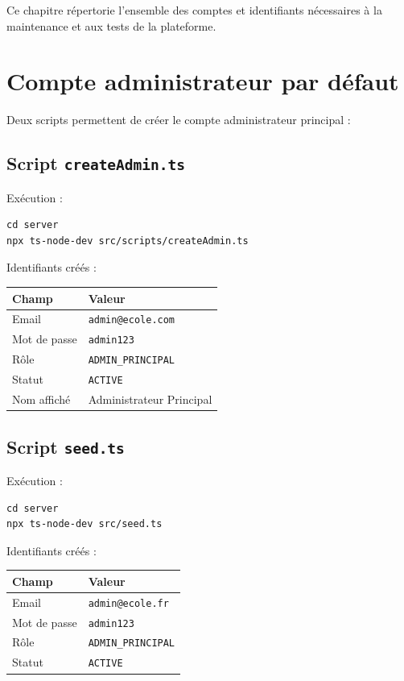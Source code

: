 \documentclass[12pt,a4paper]{report}
\begin{document}
Ce chapitre répertorie l'ensemble des comptes et identifiants nécessaires à la maintenance et aux tests de la plateforme.

\section{Compte administrateur par défaut}

Deux scripts permettent de créer le compte administrateur principal :

\subsection{Script \texttt{createAdmin.ts}}

Exécution :
\begin{lstlisting}
cd server
npx ts-node-dev src/scripts/createAdmin.ts
\end{lstlisting}

Identifiants créés :
\begin{longtable}{|p{4cm}|p{10.5cm}|}
\hline
\textbf{Champ} & \textbf{Valeur} \\
\hline
Email & \texttt{admin@ecole.com} \\
\hline
Mot de passe & \texttt{admin123} \\
\hline
Rôle & \texttt{ADMIN\_PRINCIPAL} \\
\hline
Statut & \texttt{ACTIVE} \\
\hline
Nom affiché & Administrateur Principal \\
\hline
\end{longtable}

\subsection{Script \texttt{seed.ts}}

Exécution :
\begin{lstlisting}
cd server
npx ts-node-dev src/seed.ts
\end{lstlisting}

Identifiants créés :
\begin{longtable}{|p{4cm}|p{10.5cm}|}
\hline
\textbf{Champ} & \textbf{Valeur} \\
\hline
Email & \texttt{admin@ecole.fr} \\
\hline
Mot de passe & \texttt{admin123} \\
\hline
Rôle & \texttt{ADMIN\_PRINCIPAL} \\
\hline
Statut & \texttt{ACTIVE} \\
\hline
\end{longtable}
\end{document}
